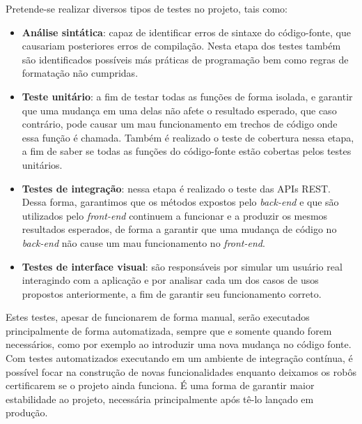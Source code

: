 Pretende-se realizar diversos tipos de testes no projeto, tais como:
\begin{itemize}
    \item \textbf{Análise sintática}: capaz de identificar erros de sintaxe do código-fonte, que causariam posteriores erros de compilação. Nesta etapa dos testes também são identificados possíveis más práticas de programação bem como regras de formatação não cumpridas.
    \item \textbf{Teste unitário}: a fim de testar todas as funções de forma isolada, e garantir que uma mudança em uma delas não afete o resultado esperado, que caso contrário, pode causar um mau funcionamento em trechos de código onde essa função é chamada. Também é realizado o teste de cobertura nessa etapa, a fim de saber se todas as funções do código-fonte estão cobertas pelos testes unitários.
    \item \textbf{Testes de integração}: nessa etapa é realizado o teste das APIs REST. Dessa forma, garantimos que os métodos expostos pelo \textit{back-end} e que são utilizados pelo \textit{front-end} continuem a funcionar e a produzir os mesmos resultados esperados, de forma a garantir que uma mudança de código no \textit{back-end} não cause um mau funcionamento no \textit{front-end}.
    \item \textbf{Testes de interface visual}: são responsáveis por simular um usuário real interagindo com a aplicação e por analisar cada um dos casos de usos propostos anteriormente, a fim de garantir seu funcionamento correto.
\end{itemize}

Estes testes, apesar de funcionarem de forma manual, serão executados principalmente de forma automatizada, sempre que e somente quando forem necessários, como por exemplo ao introduzir uma nova mudança no código fonte. Com testes automatizados executando em um ambiente de integração contínua, é possível focar na construção de novas funcionalidades enquanto deixamos os robôs certificarem se o projeto ainda funciona. É uma forma de garantir maior estabilidade ao projeto, necessária principalmente após tê-lo lançado em produção. 
